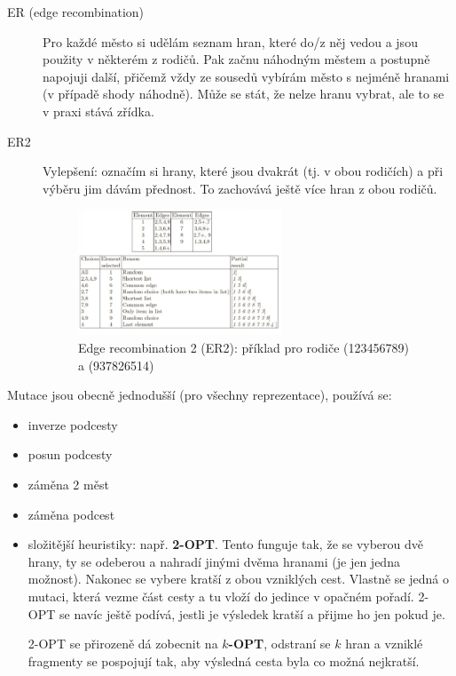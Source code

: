 \begin{description}
\begin{description}
		\item[ER (edge recombination)] Pro každé město si udělám seznam hran, které do/z něj vedou a jsou použity v některém z rodičů. Pak začnu náhodným městem a postupně napojuji další, přičemž vždy ze sousedů vybírám město s nejméně hranami (v případě shody náhodně). Může se stát, že nelze hranu vybrat, ale to se v praxi stává zřídka.
		\item[ER2] Vylepšení: označím si hrany, které jsou dvakrát (tj. v obou rodičích) a při výběru jim dávám přednost. To zachovává ještě více hran z obou rodičů.
		\begin{figure}[H]
			\centering			
			\smallskip
			\includegraphics[width=0.6\textwidth]{img/er.png}
			\caption{Edge recombination 2 (ER2): příklad pro rodiče (123456789) a (937826514)}
			\label{pmx}
			
		\end{figure}
		
	\end{description}
\end{description}



Mutace jsou obecně jednodušší (pro všechny reprezentace), používá se:
\begin{itemize}
	\leftskip 20pt
	\setlength{\itemsep}{0pt}
	\item inverze podcesty
	\item posun podcesty
	\item záměna 2 měst
	\item záměna podcest
	\item složitější heuristiky: např. \textbf{2-OPT}. Tento  funguje tak, že se vyberou dvě hrany, ty se odeberou a nahradí jinými dvěma hranami (je jen jedna možnost). Nakonec se vybere kratší z obou vzniklých cest. Vlastně se jedná o mutaci, která vezme část cesty a tu vloží do jedince v opačném pořadí. 2-OPT se navíc ještě podívá, jestli je výsledek kratší a přijme ho jen pokud je.
	
	2-OPT se přirozeně dá zobecnit na \textbf{$k$-OPT}, odstraní se $k$ hran a vzniklé fragmenty se pospojují tak, aby výsledná cesta byla co možná nejkratší.
\end{itemize}

